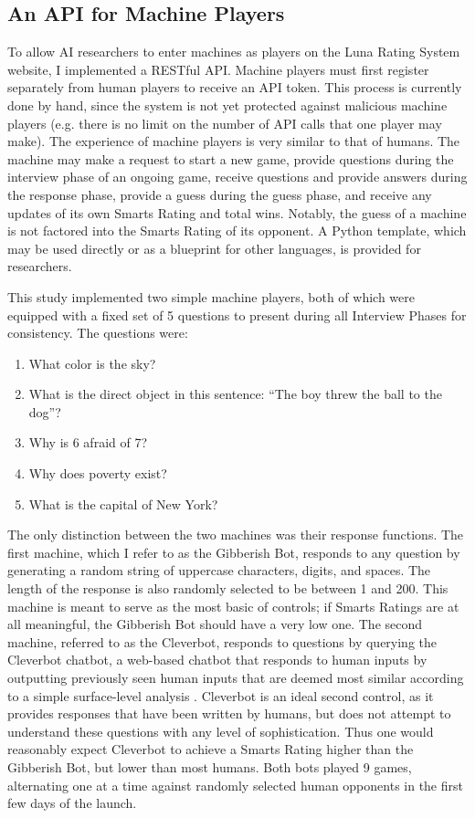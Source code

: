 \subsection{An API for Machine Players}

To allow AI researchers to enter machines as players on the Luna Rating System website, I implemented a RESTful API. Machine players must first register separately from human players to receive an API token. This process is currently done by hand, since the system is not yet protected against malicious machine players (e.g. there is no limit on the number of API calls that one player may make). The experience of machine players is very similar to that of humans. The machine may make a request to start a new game, provide questions during the interview phase of an ongoing game, receive questions and provide answers during the response phase, provide a guess during the guess phase, and receive any updates of its own Smarts Rating and total wins. Notably, the guess of a machine is not factored into the Smarts Rating of its opponent. A Python template, which may be used directly or as a blueprint for other languages, is provided for researchers. 


This study implemented two simple machine players, both of which were equipped with a fixed set of 5 questions to present during all Interview Phases for consistency. The questions were:

\begin{enumerate}
\item What color is the sky?
\item What is the direct object in this sentence: ``The boy threw the ball to the dog''? 
\item Why is 6 afraid of 7?
\item Why does poverty exist?
\item What is the capital of New York?
\end{enumerate}

The only distinction between the two machines was their response functions. The first machine, which I refer to as the Gibberish Bot, responds to any question by generating a random string of uppercase characters, digits, and spaces. The length of the response is also randomly selected to be between 1 and 200. This machine is meant to serve as the most basic of controls; if Smarts Ratings are at all meaningful, the Gibberish Bot should have a very low one. The second machine, referred to as the Cleverbot, responds to questions by querying the Cleverbot chatbot, a web-based chatbot that responds to human inputs by outputting previously seen human inputs that are deemed most similar according to a simple surface-level analysis  \citep{carpenter2015cleverbot}. Cleverbot is an ideal second control, as it provides responses that have been written by humans, but does not attempt to understand these questions with any level of sophistication. Thus one would reasonably expect Cleverbot to achieve a Smarts Rating higher than the Gibberish Bot, but lower than most humans. Both bots played 9 games, alternating one at a time against randomly selected human opponents in the first few days of the launch.


